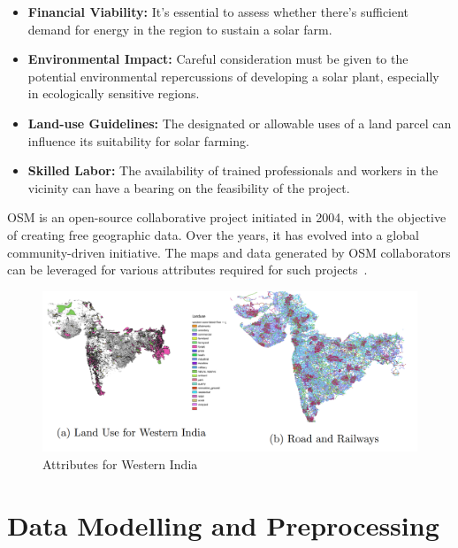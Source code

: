 \documentclass[a4paper,12pt]{Classes/RoboticsLaTeX}
\begin{document}
	\begin{itemize}
		\item \textbf{Financial Viability:} It's essential to assess whether there's sufficient demand for energy in the region to sustain a solar farm.
		
		\item \textbf{Environmental Impact:} Careful consideration must be given to the potential environmental repercussions of developing a solar plant, especially in ecologically sensitive regions.
		
		\item \textbf{Land-use Guidelines:} The designated or allowable uses of a land parcel can influence its suitability for solar farming.
		
		\item \textbf{Skilled Labor:} The availability of trained professionals and workers in the vicinity can have a bearing on the feasibility of the project.
	\end{itemize}

	\ac{OSM} is an open-source collaborative project initiated in 2004, with the objective of creating free geographic data. Over the years, 
	it has evolved into a global community-driven initiative. The maps and data generated by OSM collaborators can be leveraged for various attributes required 
	for such projects~\cite{openstreetmap2017}.
	\begin{figure}[H]
		\centering
		\includegraphics[width=1\textwidth]{Figures/Other attributes.png} %
		\caption{Attributes for Western India}
		\label{fig:my_label5} %
	\end{figure}


	\section{Data Modelling and Preprocessing}
\end{document}
